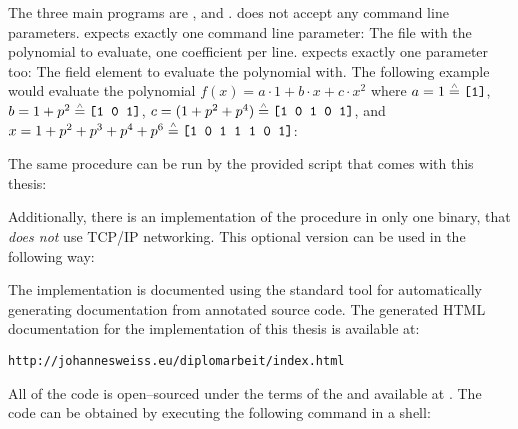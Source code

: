 %
%
\label{sec:usage}

The three main programs are \JWBpOne{}, \JWBpTwo{} and \JWBtoken{}. \JWBtoken{}
does not accept any command line parameters. \JWpOne{} expects exactly one
command line parameter: The file with the polynomial to evaluate, one
coefficient per line. \JWpTwo{} expects exactly one parameter too: The field
element to evaluate the polynomial with. The following example would evaluate
the polynomial $f(x) = a \cdot 1 + b \cdot x + c \cdot x^2$ where $a = 1
\stackrel{\scriptscriptstyle\wedge}{=} \text{\texttt{[1]}}$, $b = 1 + p^2 \stackrel{\scriptscriptstyle\wedge}{=} \text{\texttt{[1 0
1]}}$, $c = (1 + p^2 + p^4) \stackrel{\scriptscriptstyle\wedge}{=} \text{\texttt{[1 0 1 0 1]}}$, and $x = 1
  + p^2 + p^3 + p^4 + p^6 \stackrel{\scriptscriptstyle\wedge}{=} \text{\texttt{[1 0 1 1 1 0 1]}}$:

\medskip{}





\medskip{}

\noindent{}The same procedure can be run by the provided
 script that comes with this thesis:

\medskip{}


\medskip{}

\noindent{}Additionally, there is an implementation of the procedure in only one
binary, that \emph{does not} use TCP/IP networking. This optional version can be
used in the following way:

\medskip{}



%
%
\label{sec:implementation-doc}

The implementation is documented using \JWTLhaddock{} the standard tool for
automatically generating documentation from annotated \JWThaskell{} source code.
The generated HTML documentation for the implementation of this thesis is
available at:

\medskip{}

\noindent{}
%
            {\texttt{http://johannesweiss.eu/diplomarbeit/index.html}}


%
%
\label{sec:code-availability}

All of the code is open--sourced under the terms of the \JWTXLgpl{} and
available at .
The code can be obtained by executing the following command in a shell:



